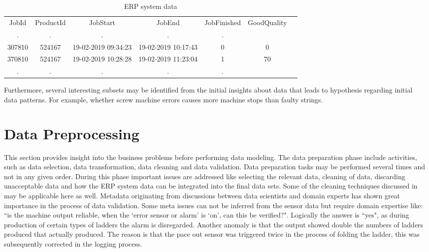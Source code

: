 \documentclass[runningheads]{llncs}
\begin{document}
\begin{table}[ht]
\caption{ERP system data}
\label{example2}
\centering
\begin{tabular}{ccccccc}
\hline\noalign{\smallskip}
JobId & ProductId & JobStart & JobEnd &  JobFinished & GoodQuality\\
\noalign{\smallskip}
\hline
\noalign{\smallskip}
. & . & . & . &  .   \\
307810  & 524167 & 19-02-2019 09:34:23  & 19-02-2019 10:17:43   & 0 & 0\\
370810  & 524167 & 19-02-2019 10:28:28  & 19-02-2019 11:23:04   & 1 & 70\\
. & . & . & . &  .   \\
\hline
\end{tabular}
\end{table}

Furthermore, several interesting subsets may be identified from the initial insights about data that leads to hypothesis regarding initial data patterns. For example, whether screw machine errors causes more machine stops than faulty strings. 




 

\section {Data Preprocessing}
\label{sec:datapreparation}
\iffalse
This section provides insight into the business problems before performing data modeling. The data preparation phase include activities, such as data selection, data transformation, data cleaning and data validation. Data preparation tasks may be performed several times and not in any given order. During this phase important issues are addressed like selecting the relevant data, cleaning of data, discarding unacceptable data and how the ERP system data can be integrated into the final data sets. Some of the cleaning techniques discussed in \cite{iftikhar} may be applicable here as well. Metadata originating from discussions between data scientists and domain experts has shown great importance in the process of data validation. Some meta issues can not be inferred from the sensor data but require domain expertise like: ``is the machine output reliable, when the `error sensor or alarm' is `on', can this be verified?". Logically the answer is ``yes", as during production of certain types of ladders the alarm is disregarded. Another anomaly is that the output showed double the numbers of ladders produced that actually produced. The reason is that the pace out sensor was triggered twice in the process of folding the ladder, this was subsequently corrected in the logging process. 
\end{document}
